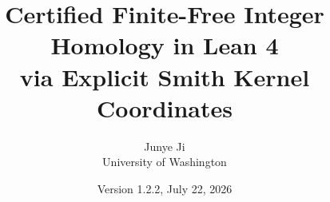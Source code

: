 \documentclass[11pt]{article}
\title{Certified Finite-Free Integer Homology in Lean 4\\
via Explicit Smith Kernel Coordinates}
\author{Junye Ji\\University of Washington}
\date{Version 1.2.2, July 22, 2026}
\begin{document}
\maketitle

\begin{abstract}

\end{abstract}












\end{document}
